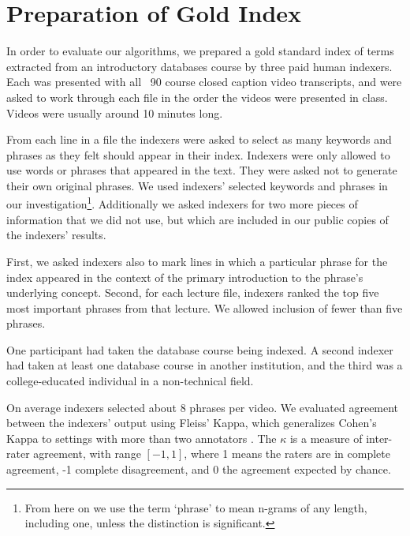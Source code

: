\section{Preparation of Gold Index}
\label{sec:gold}


In order to evaluate our algorithms, we prepared a gold standard index
of terms extracted from an introductory databases course by three paid
human indexers. Each was presented with all ~90 course closed caption
video transcripts, and were asked to work through each file in the
order the videos were presented in class. Videos were usually around
10 minutes long.

From each line in a file the indexers were asked to select as many
keywords and phrases as they felt should appear in their
index. Indexers were only allowed to use words or phrases that
appeared in the text. They were asked not to generate their own
original phrases. We used indexers' selected keywords and phrases in
our investigation\footnote{From here on we use the term `phrase' to
  mean n-grams of any length, including one, unless the distinction is
  significant.}. Additionally we asked indexers for two more pieces of
information that we did not use, but which are included in our public
copies of the indexers' results.

First, we asked indexers also to mark lines in which a particular
phrase for the index appeared in the context of the primary
introduction to the phrase's underlying concept.  Second, for each
lecture file, indexers ranked the top five most important phrases from
that lecture. We allowed inclusion of fewer than five phrases.

One participant had taken the database course being indexed. A second
indexer had taken at least one database course in another institution,
and the third was a college-educated individual in a non-technical
field.

On average indexers selected about 8 phrases per video.  We evaluated
agreement between the indexers' output using Fleiss' Kappa, which
generalizes Cohen's Kappa to settings with more than two annotators
\cite{fleiss1971measuring}. The $\kappa$ is a measure of inter-rater
agreement, with range $[-1, 1]$, where 1 means the raters are in
complete agreement, -1 complete disagreement, and 0 the agreement
expected by chance.

